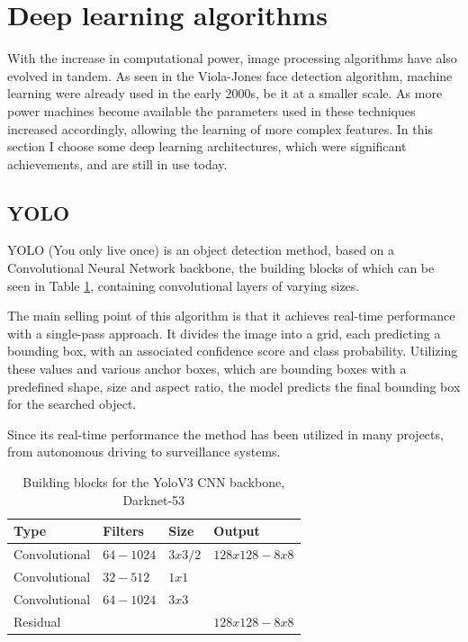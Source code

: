 \section{Deep learning algorithms}
\label{sec:relatedsec2}
\par With the increase in computational power, image processing algorithms have also evolved in tandem. As seen in the Viola-Jones face detection algorithm, machine learning were already used in the early 2000s, be it at a smaller scale. As more power machines become available the parameters used in these techniques increased accordingly, allowing the learning of more complex features. In this section I choose some deep learning architectures, which were significant achievements, and are still in use today.

\subsection{YOLO}
\label{subsec:relatedsec2subsec1}
\par YOLO (You only live once) is an object detection method, based on a Convolutional Neural Network backbone, the building blocks of which can be seen in Table \ref{YoloTable}, containing convolutional layers of varying sizes.
\par The main selling point of this algorithm is that it achieves real-time performance with a single-pass approach. It divides the image into a grid, each predicting a bounding box, with an associated confidence score and class probability. Utilizing these values and various anchor boxes, which are bounding boxes with a predefined shape, size and aspect ratio, the model predicts the final bounding box for the searched object. \cite{redmon2018yolov3}
\par Since its real-time performance the method has been utilized in many projects, from autonomous driving to surveillance systems.

\begin{table}[htbp]
\begin{center}
\begin{tabular}
{|p{90pt}|p{90pt}|p{90pt}|p{90pt}|}
\hline
 Type  &  Filters & Size & Output\\
\hline 
\hline Convolutional & $64-1024$ & $3x3/2$ & $128x128-8x8$ \\
\hline Convolutional & $32-512$ & $1x1$ & $ $ \\
\hline Convolutional & $64-1024$ & $3x3$ & $ $ \\
\hline Residual & $ $ & $ $ & $128x128-8x8$ \\
\hline
\end{tabular}
\end{center}
\caption{Building blocks for the YoloV3 CNN backbone, Darknet-53 \cite{redmon2018yolov3}}
\label{YoloTable}
\end{table}

